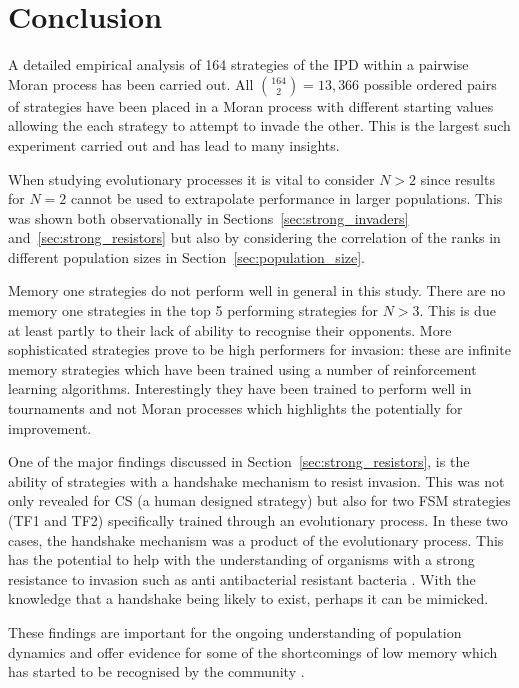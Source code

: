 \documentclass{article}
\begin{document}
\section{Conclusion}\label{sec:conclusion}

A detailed empirical analysis of 164 strategies of the IPD within a pairwise
Moran process has been carried out. All \(\binom{164}{2}=13,366\) possible
ordered pairs of strategies have been placed in a Moran process with different
starting values allowing the each strategy to attempt to invade the other.
This is the largest such experiment carried out and has lead to many insights.

When studying evolutionary processes it is vital to consider \(N>2\) since
results for \(N=2\) cannot be used to extrapolate performance in larger
populations. This was shown both observationally in
Sections~\ref{sec:strong_invaders} and~\ref{sec:strong_resistors} but also by
considering the correlation of the ranks in different population sizes in
Section~\ref{sec:population_size}.

Memory one strategies do not perform well in general in this study. There are
no memory one strategies in the top 5 performing strategies
for \(N>3\). This is due at least partly to their lack of ability to
recognise their opponents. More sophisticated strategies
prove to be high performers for invasion: these are infinite memory strategies
which have been trained using a number of reinforcement learning algorithms.
Interestingly they have been trained to perform well in tournaments and not
Moran processes which highlights the potentially for improvement.

One of the major findings discussed in Section~\ref{sec:strong_resistors}, is
the ability of strategies with a handshake mechanism to resist invasion. This
was not only revealed for CS (a human designed strategy) but also for
two FSM strategies (TF1 and TF2) specifically trained through an evolutionary
process. In these two cases, the handshake mechanism was a product of the
evolutionary process. This has the potential to help with the understanding of
organisms with a strong resistance to invasion such as anti antibacterial
resistant bacteria \cite{Davies2010}. With the knowledge that a handshake being
likely to exist, perhaps it can be mimicked.

These findings are important for the ongoing understanding of
population dynamics and offer evidence for some of the shortcomings of low
memory which has started to be recognised by the community \cite{Hilbe2017}.
\end{document}
